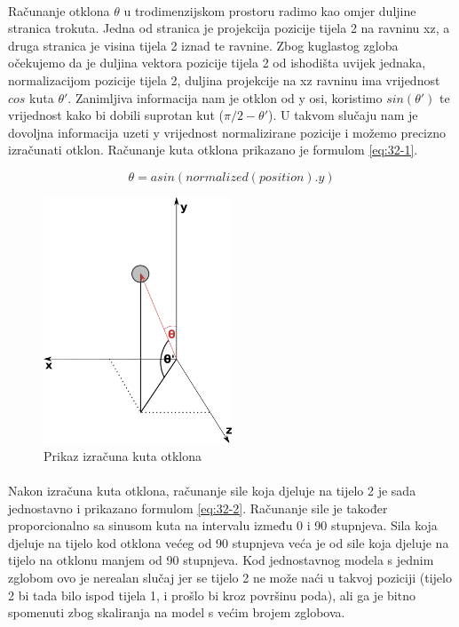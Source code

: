 \documentclass[times, utf8, diplomski]{fer}
\begin{document}
\paragraph{}
Računanje otklona $\theta$ u trodimenzijskom prostoru radimo kao omjer duljine 
stranica trokuta. Jedna od stranica je projekcija pozicije tijela 2 na ravninu 
xz, a druga stranica je visina tijela 2 iznad te ravnine. Zbog kuglastog zgloba 
očekujemo da je duljina vektora pozicije tijela 2 od ishodišta uvijek jednaka, 
normalizacijom pozicije tijela 2, duljina projekcije na xz ravninu ima 
vrijednost $cos$ kuta $\theta'$. Zanimljiva informacija nam je otklon od y osi, koristimo 
$sin(\theta')$ te vrijednost kako bi dobili suprotan kut ($\pi / 2 - \theta'$). U takvom 
slučaju nam je dovoljna informacija uzeti y vrijednost normalizirane pozicije i možemo 
precizno izračunati otklon. Računanje kuta otklona prikazano je formulom \ref{eq:32-1}.

\begin{equation}
\theta = asin(normalized(position).y)
\label{eq:32-1}
\end{equation}

\begin{figure}[h]
	\centering
	\includegraphics[width=0.5\textwidth]{img/32-2}
	\caption{Prikaz izračuna kuta otklona}
	\label{fig:32-2}
\end{figure}


\paragraph{}
Nakon izračuna kuta otklona, računanje sile koja djeluje na tijelo 2 je sada jednostavno i 
prikazano formulom \ref{eq:32-2}. Računanje sile je također proporcionalno sa sinusom kuta 
na intervalu između 0 i 90 stupnjeva. Sila koja djeluje na tijelo kod otklona većeg od 90 
stupnjeva veća je od sile koja djeluje na tijelo na otklonu manjem od 90 stupnjeva. Kod 
jednostavnog modela s jednim zglobom ovo je nerealan slučaj jer se tijelo 2 ne može naći u  
takvoj poziciji (tijelo 2 bi tada bilo ispod tijela 1, i prošlo bi kroz površinu poda), ali 
ga je bitno spomenuti zbog skaliranja na model s većim brojem zglobova.
\end{document}
